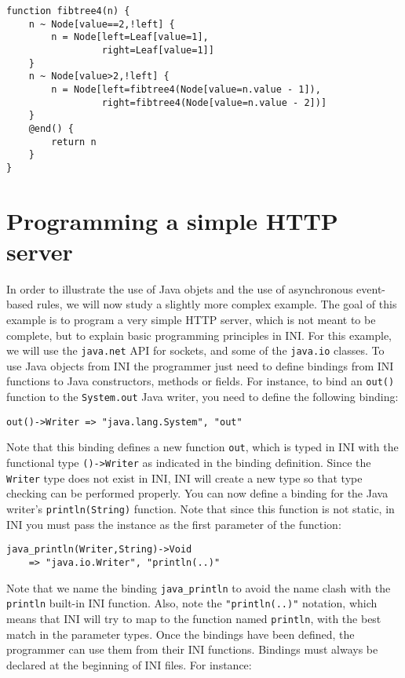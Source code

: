 \documentclass[11pt]{report}
\begin{document}
\begin{lstlisting}
function fibtree4(n) {
	n ~ Node[value==2,!left] {
		n = Node[left=Leaf[value=1],
		         right=Leaf[value=1]]
	}
	n ~ Node[value>2,!left] {
		n = Node[left=fibtree4(Node[value=n.value - 1]),
		         right=fibtree4(Node[value=n.value - 2])]
	}
	@end() {
		return n
	}
}
\end{lstlisting}

\section{Programming a simple HTTP server}

In order to illustrate the use of Java objets and the use of asynchronous event-based rules, we will now study a slightly more complex example. The goal of this example is to program a very simple HTTP server, which is not meant to be complete, but to explain basic programming principles in INI. For this example, we will use the \texttt{java.net} API for sockets, and some of the \texttt{java.io} classes. To use Java objects from INI the programmer just need to define bindings from INI functions to Java constructors, methods or fields. For instance, to bind an \texttt{out()} function to the \texttt{System.out} Java writer, you need to define the following binding:

\begin{lstlisting}[numbers=none]
out()->Writer => "java.lang.System", "out"
\end{lstlisting}

Note that this binding defines a new function \texttt{out}, which is typed in INI with the functional type \texttt{()->Writer} as indicated in the binding definition. Since the \texttt{Writer} type does not exist in INI, INI will create a new type so that type checking can be performed properly. You can now define a binding for the Java writer's \texttt{println(String)} function. Note that since this function is not static, in INI you must pass the instance as the first parameter of the function:

\begin{lstlisting}[numbers=none]
java_println(Writer,String)->Void
	=> "java.io.Writer", "println(..)"
\end{lstlisting}

Note that we name the binding \texttt{java\_println} to avoid the name clash with the \texttt{println} built-in INI function. Also, note the \texttt{"println(..)"} notation, which means that INI will try to map to the function named \texttt{println}, with the best match in the parameter types. Once the bindings have been defined, the programmer can use them from their INI functions. Bindings must always be declared at the beginning of INI files. For instance:
\end{document}
